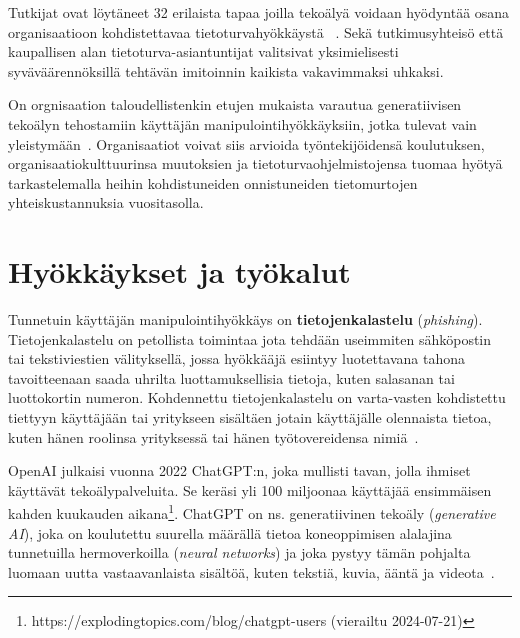 \begin{otherlanguage}{finnish}
Tutkijat ovat löytäneet 32 erilaista tapaa joilla tekoälyä voidaan hyödyntää osana organisaatioon kohdistettavaa tietoturvahyökkäystä ~\citep{mirsky_Threat_Offensive_AI_Organizations_2023}. Sekä tutkimusyhteisö että kaupallisen alan tietoturva-asiantuntijat valitsivat yksimielisesti syväväärennöksillä tehtävän imitoinnin kaikista vakavimmaksi uhkaksi. 

On orgnisaation taloudellistenkin etujen mukaista varautua generatiivisen tekoälyn tehostamiin käyttäjän manipulointihyökkäyksiin, jotka tulevat vain yleistymään~\citep{blauth_AI_Crime_Overview_Malicious_Use_Abuse_2022}. Organisaatiot voivat siis arvioida työntekijöidensä koulutuksen, organisaatiokulttuurinsa muutoksien ja tietoturvaohjelmistojensa tuomaa hyötyä tarkastelemalla heihin kohdistuneiden onnistuneiden tietomurtojen yhteiskustannuksia vuositasolla.







\section*{Hyökkäykset ja työkalut}

Tunnetuin käyttäjän manipulointihyökkäys on \textbf{tietojenkalastelu} (\textit{phishing}). Tietojenkalastelu on petollista toimintaa jota tehdään useimmiten sähköpostin tai tekstiviestien välityksellä, jossa hyökkääjä esiintyy luotettavana tahona tavoitteenaan saada uhrilta luottamuksellisia tietoja, kuten salasanan tai luottokortin numeron. Kohdennettu tietojenkalastelu on varta-vasten kohdistettu tiettyyn käyttäjään tai yritykseen sisältäen jotain käyttäjälle olennaista tietoa, kuten hänen roolinsa yrityksessä tai hänen työtovereidensa nimiä~\citep{wang_Defining_Social_Engineering_2020}.

OpenAI julkaisi vuonna 2022 ChatGPT:n, joka mullisti tavan, jolla ihmiset käyttävät tekoälypalveluita. Se keräsi yli 100 miljoonaa käyttäjää ensimmäisen kahden kuukauden aikana\footnote{https://explodingtopics.com/blog/chatgpt-users (vierailtu 2024-07-21)}. ChatGPT on ns. generatiivinen tekoäly (\textit{generative AI}), joka on koulutettu suurella määrällä tietoa koneoppimisen alalajina tunnetuilla hermoverkoilla (\textit{neural networks}) ja joka pystyy tämän pohjalta luomaan uutta vastaavanlaista sisältöä, kuten tekstiä, kuvia, ääntä ja videota~\citep{fakhouri_AI_Driven_Solutions_SE_Attacks_2024}.


\end{otherlanguage}
